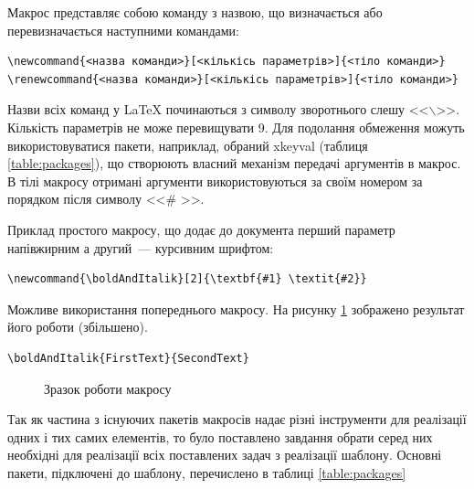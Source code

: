 Макрос представляє собою команду з назвою, що визначається або перевизначається наступними командами\cite{Sjutkin2002Manual}:
\begin{verbatim}
\newcommand{<назва команди>}[<кількісь параметрів>]{<тіло команди>}
\renewcommand{<назва команди>}[<кількісь параметрів>]{<тіло команди>}
\end{verbatim}

Назви всіх команд у \LaTeX{} починаються з символу зворотнього слешу <<$\backslash$>>. Кількість параметрів не може перевищувати 9. Для подолання обмеження можуть використовуватися пакети, наприклад, обраний xkeyval (таблиця \ref{table:packages}), що створюють власний механізм передачі аргументів в макрос. В тілі макросу отримані аргументи використовуються за своїм номером за порядком після символу <<\# >>.

Приклад простого макросу, що додає до документа перший параметр напівжирним а другий~--- курсивним шрифтом:
\begin{verbatim}
\newcommand{\boldAndItalik}[2]{\textbf{#1} \textit{#2}}
\end{verbatim}

Можливе використання попереднього макросу. На рисунку \ref{ris:image} зображено результат його роботи (збільшено).
\begin{verbatim}
\boldAndItalik{FirstText}{SecondText}
\end{verbatim}


\begin{figure}[ht]
\caption{Зразок роботи макросу}
\label{ris:image}
\end{figure}

Так як частина з існуючих пакетів макросів надає різні інструменти для реалізації одних і тих самих елементів, то було поставлено завдання обрати серед них необхідні для реалізації всіх поставлених задач з реалізації шаблону. Основні пакети, підключені до шаблону, перечислено в таблиці \ref{table:packages}

